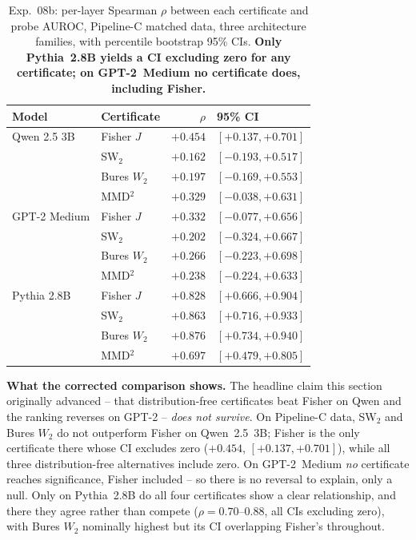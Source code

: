 \documentclass[onecolumn]{jmlr}
\begin{document}
\begin{table}[!htbp]
\centering
\caption{Exp.~08b: per-layer Spearman $\rho$ between each certificate and probe
  AUROC, Pipeline-C matched data, three architecture families, with percentile
  bootstrap 95\% CIs. \textbf{Only Pythia~2.8B yields a CI excluding zero for
  any certificate; on GPT-2~Medium no certificate does, including Fisher.}}
\label{tab:ot-matched}
\small
\setlength{\tabcolsep}{4pt}
\begin{tabular}{llrl}
\toprule
\textbf{Model} & \textbf{Certificate} & $\rho$ & \textbf{95\% CI} \\
\midrule
Qwen 2.5 3B   & Fisher $J$   & $+0.454$ & $[+0.137,+0.701]$ \\
              & SW$_2$       & $+0.162$ & $[-0.193,+0.517]$ \\
              & Bures $W_2$  & $+0.197$ & $[-0.169,+0.553]$ \\
              & MMD$^2$      & $+0.329$ & $[-0.038,+0.631]$ \\
\midrule
GPT-2 Medium  & Fisher $J$   & $+0.332$ & $[-0.077,+0.656]$ \\
              & SW$_2$       & $+0.202$ & $[-0.324,+0.667]$ \\
              & Bures $W_2$  & $+0.266$ & $[-0.223,+0.698]$ \\
              & MMD$^2$      & $+0.238$ & $[-0.224,+0.633]$ \\
\midrule
Pythia 2.8B   & Fisher $J$   & $+0.828$ & $[+0.666,+0.904]$ \\
              & SW$_2$       & $+0.863$ & $[+0.716,+0.933]$ \\
              & Bures $W_2$  & $+0.876$ & $[+0.734,+0.940]$ \\
              & MMD$^2$      & $+0.697$ & $[+0.479,+0.805]$ \\
\bottomrule
\end{tabular}
\end{table}

\textbf{What the corrected comparison shows.} The headline claim this section
originally advanced -- that distribution-free certificates beat Fisher on Qwen
and the ranking reverses on GPT-2 -- \emph{does not survive}. On Pipeline-C
data, SW$_2$ and Bures $W_2$ do not outperform Fisher on Qwen~2.5~3B; Fisher is
the only certificate there whose CI excludes zero ($+0.454$, $[+0.137,+0.701]$),
while all three distribution-free alternatives include zero. On GPT-2~Medium
\emph{no} certificate reaches significance, Fisher included -- so there is no
reversal to explain, only a null. Only on Pythia~2.8B do all four certificates
show a clear relationship, and there they agree rather than compete
($\rho=0.70$--$0.88$, all CIs excluding zero), with Bures $W_2$ nominally
highest but its CI overlapping Fisher's throughout.
\end{document}
